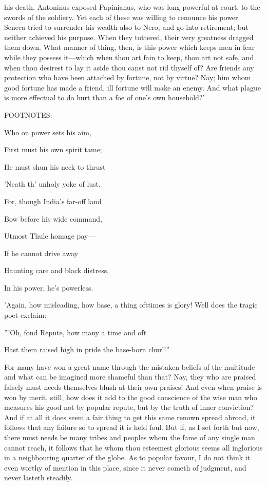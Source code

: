 his death. Antoninus exposed Papinianus, who was long powerful at
court, to the swords of the soldiery. Yet each of these was willing to
renounce his power. Seneca tried to surrender his wealth also to Nero,
and go into retirement; but neither achieved his purpose. When they
tottered, their very greatness dragged them down. What manner of thing,
then, is this power which keeps men in fear while they possess it—which
when thou art fain to keep, thou art not safe, and when thou desirest to
lay it aside thou canst not rid thyself of? Are friends any protection
who have been attached by fortune, not by virtue? Nay; him whom good
fortune has made a friend, ill fortune will make an enemy. And what
plague is more effectual to do hurt than a foe of one's own household?'

FOOTNOTES:


Who on power sets his aim,

First must his own spirit tame;

He must shun his neck to thrust

'Neath th' unholy yoke of lust.

For, though India's far-off land

Bow before his wide command,

Utmost Thule homage pay—

If he cannot drive away

Haunting care and black distress,

In his power, he's powerless.


'Again, how misleading, how base, a thing ofttimes is glory! Well does
the tragic poet exclaim:

'''Oh, fond Repute, how many a time and oft

Hast them raised high in pride the base-born churl!''

For many have won a great name through the mistaken beliefs of the
multitude—and what can be imagined more shameful than that? Nay, they
who are praised falsely must needs themselves blush at their own
praises! And even when praise is won by merit, still, how does it add to
the good conscience of the wise man who measures his good not by popular
repute, but by the truth of inner conviction? And if at all it does seem
a fair thing to get this same renown spread abroad, it follows that any
failure so to spread it is held foul. But if, as I set forth but now,
there must needs be many tribes and peoples whom the fame of any single
man cannot reach, it follows that he whom thou esteemest glorious seems
all inglorious in a neighbouring quarter of the globe. As to popular
favour, I do not think it even worthy of mention in this place, since it
never cometh of judgment, and never lasteth steadily.


